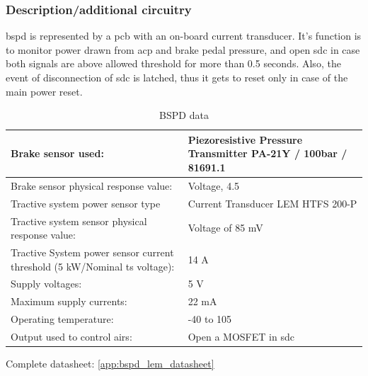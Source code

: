 
\subsubsection{Description/additional circuitry}

\Acrfull{bspd} is represented by a \gls{pcb} with an on-board current transducer. It’s function is to monitor
power drawn from \gls{acp} and brake pedal pressure, and open \gls{sdc} in case both signals are above
allowed threshold for more than 0.5 seconds. Also, the event of disconnection of \gls{sdc} is latched,
thus it gets to reset only in case of the main power reset.


\begin{table}[H]
	\centering
	\caption{BSPD data}
	\begin{tabu}{|X|X|}
		\hline
		Brake sensor used: & Piezoresistive Pressure Transmitter PA-21Y / 100bar / 81691.1 \\
		\hline
		Brake sensor physical response value: & Voltage, 4.5 \vdc \\
		\hline
		Tractive system power sensor type & Current Transducer LEM HTFS 200-P \\
		\hline
		Tractive system sensor physical response value: & Voltage of 85 mV \\
		\hline
		Tractive System power sensor current threshold (5 kW/Nominal \gls{ts} voltage): & 14 A \\
		\hline
		Supply voltages: & 5 V \\
		\hline
		Maximum supply currents: & 22 mA \\
		\hline
		Operating temperature: & -40 \degC to 105 \degC \\
		\hline
		Output used to control \glspl{air}: & Open a MOSFET in \gls{sdc} \\
		\hline
	\end{tabu}%
	\label{tab:bspd}%
\end{table}%

Complete datasheet: \ref{app:bspd_lem_datasheet}

